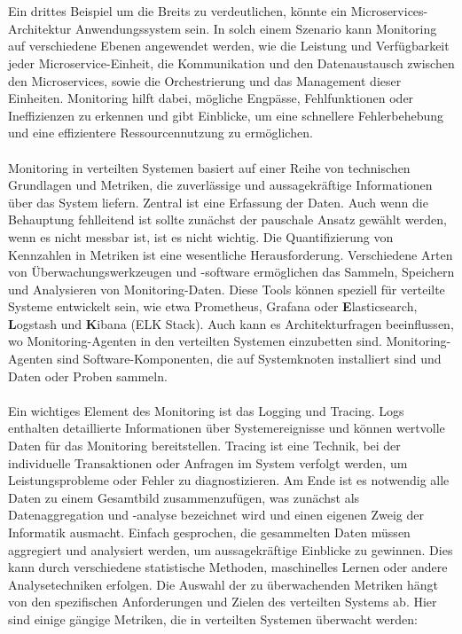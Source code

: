 \\\\
Ein drittes Beispiel um die Breits zu verdeutlichen, könnte ein Microservices-Architektur Anwendungssystem sein. In solch einem Szenario kann Monitoring auf verschiedene Ebenen angewendet werden, wie die Leistung und Verfügbarkeit jeder Microservice-Einheit, die Kommunikation und den Datenaustausch zwischen den Microservices, sowie die Orchestrierung und das Management dieser Einheiten. Monitoring hilft dabei, mögliche Engpässe, Fehlfunktionen oder Ineffizienzen zu erkennen und gibt Einblicke, um eine schnellere Fehlerbehebung und eine effizientere Ressourcennutzung zu ermöglichen.
\\\\
Monitoring in verteilten Systemen basiert auf einer Reihe von technischen Grundlagen und Metriken, die zuverlässige und aussagekräftige Informationen über das System liefern. Zentral ist eine Erfassung der Daten. Auch wenn die Behauptung fehlleitend ist sollte zunächst der pauschale Ansatz gewählt werden, wenn es nicht messbar ist, ist es nicht wichtig. Die Quantifizierung von Kennzahlen in Metriken ist eine wesentliche Herausforderung. Verschiedene Arten von Überwachungswerkzeugen und -software ermöglichen das Sammeln, Speichern und Analysieren von Monitoring-Daten. Diese Tools können speziell für verteilte Systeme entwickelt sein, wie etwa Prometheus, Grafana oder \textbf{E}lasticsearch, \textbf{L}ogstash und \textbf{K}ibana (ELK Stack).
Auch kann es Architekturfragen beeinflussen, wo Monitoring-Agenten in den verteilten Systemen einzubetten sind. Monitoring-Agenten sind Software-Komponenten, die auf Systemknoten installiert sind und Daten  oder Proben sammeln. 
\\\\
Ein wichtiges Element des Monitoring ist das Logging und Tracing. Logs enthalten detaillierte Informationen über Systemereignisse und können wertvolle Daten für das Monitoring bereitstellen. Tracing ist eine Technik, bei der individuelle Transaktionen oder Anfragen im System verfolgt werden, um Leistungsprobleme oder Fehler zu diagnostizieren.
Am Ende ist es notwendig alle Daten zu einem Gesamtbild zusammenzufügen, was zunächst als Datenaggregation und -analyse bezeichnet wird und einen eigenen Zweig der Informatik ausmacht. Einfach gesprochen, die gesammelten Daten müssen aggregiert und analysiert werden, um aussagekräftige Einblicke zu gewinnen. Dies kann durch verschiedene statistische Methoden, maschinelles Lernen oder andere Analysetechniken erfolgen.
Die Auswahl der zu überwachenden Metriken hängt von den spezifischen Anforderungen und Zielen des verteilten Systems ab. Hier sind einige gängige Metriken, die in verteilten Systemen überwacht werden:
